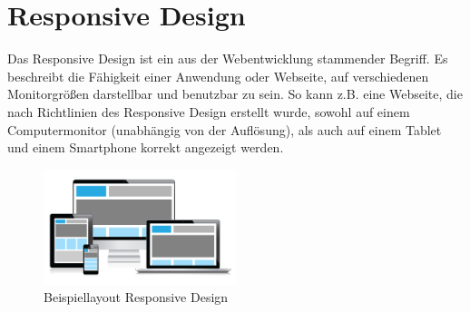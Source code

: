 \section{Responsive Design} %
Das Responsive Design ist ein aus der Webentwicklung stammender Begriff. Es beschreibt die Fähigkeit einer Anwendung oder Webseite, auf verschiedenen Monitorgrößen darstellbar und benutzbar zu sein. So kann z.B. eine Webseite, die nach Richtlinien des Responsive Design erstellt wurde, sowohl auf einem Computermonitor (unabhängig von der Auflösung), als auch auf einem Tablet und einem Smartphone korrekt angezeigt werden.\par
\begin{figure}[H]
 \centering
 \includegraphics[width=0.5\textwidth]{grafiken/responsive_design.png}
 \caption{Beispiellayout Responsive Design \cite{Moon2013}}
 \label{fig:responsiveDesign}
\end{figure} 